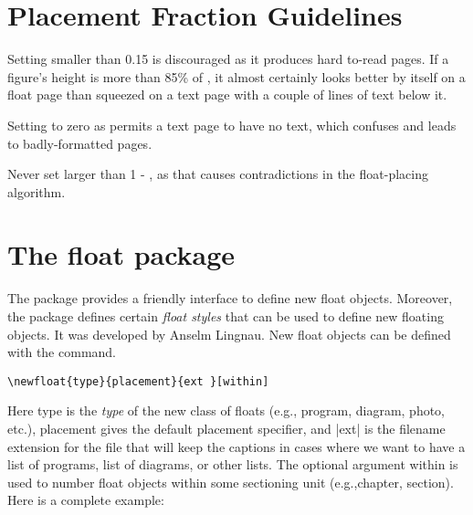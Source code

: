 \section{Placement Fraction Guidelines}

\begin{macro}{\textfaction}
    Setting \textfraction smaller than 0.15 is discouraged as it produces hard to-read
    pages. If a figure’s height is more than 85\% of \cmd{\textheight}, it almost
    certainly looks better by itself on a float page than squeezed on a text page
    with a couple of lines of text below it.
    
    Setting  to zero as permits a text page to have
   no text, which confuses \latex and leads to badly-formatted pages.
\end{macro}

\begin{macro}{\topfraction}
Never set \cmd{\topfraction} larger than 1 - \cmd{\textfraction}, as that causes contradictions
in the float-placing algorithm.
\end{macro}


\begin{teX}
\renewcommand{\topfraction}{.85}
\renewcommand{\bottomfraction}{.7} %
\renewcommand{\textfraction}{.15}
\renewcommand{\floatpagefraction}{.7}
\renewcommand{\dbltopfraction}{.66}
\renewcommand{\dblfloatpagefraction}{.66}
\setcounter{topnumber}{9}
\setcounter{bottomnumber}{9}
\setcounter{totalnumber}{20}
\setcounter{dbltopnumber}{9}
\end{teX}

\section{The float package}
 
The  package provides a friendly interface to define new float objects. Moreover, the package
defines certain \emph{float styles} that can be used to define new floating objects.  It
was developed by Anselm Lingnau. New float objects can be defined with the command.

\begin{verbatim}
\newfloat{type}{placement}{ext }[within]
\end{verbatim}



Here type is the \emph{type}  of the new class of floats (e.g., program, diagram, photo, etc.),
placement gives the default placement specifier, and |ext| is the filename extension
for the file that will keep the captions in cases where we want to have a list of programs,
list of diagrams, or other lists. The optional argument within is used to number float
objects within some sectioning unit (e.g.,chapter, section). Here is a complete example:

